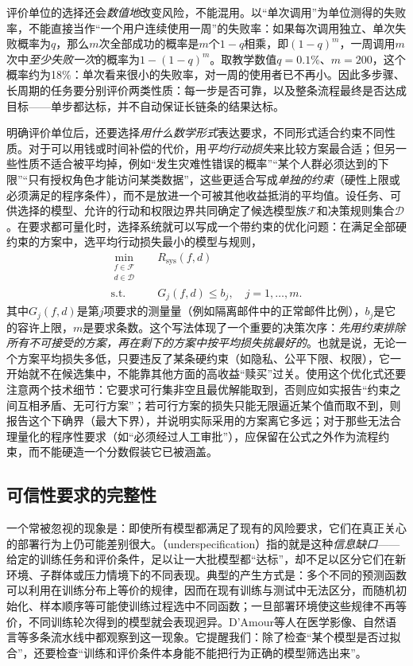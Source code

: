 评价单位的选择还会\emph{数值地}改变风险，不能混用。以“单次调用”为单位测得的失败率，不能直接当作“一个用户连续使用一周”的失败率：如果每次调用独立、单次失败概率为$q$，那么$m$次全部成功的概率是$m$个$1-q$相乘，即$(1-q)^m$，一周调用$m$次中\emph{至少失败一次}的概率为$1-(1-q)^m$。取教学数值$q=0.1\%$、$m=200$，这个概率约为18\%：单次看来很小的失败率，对一周的使用者已不再小。因此多步骤、长周期的任务要分别评价两类性质：每一步是否可靠，以及整条流程最终是否达成目标——单步都达标，并不自动保证长链条的结果达标。

明确评价单位后，还要选择\emph{用什么数学形式}表达要求，不同形式适合约束不同性质。对于可以用钱或时间补偿的代价，用\emph{平均行动损失}来比较方案最合适；但另一些性质不适合被平均掉，例如“发生灾难性错误的概率”“某个人群必须达到的下限”“只有授权角色才能访问某类数据”，这些更适合写成\emph{单独的约束}（硬性上限或必须满足的程序条件），而不是放进一个可被其他收益抵消的平均值。设任务、可供选择的模型、允许的行动和权限边界共同确定了候选模型族$\mathcal F$和决策规则集合$\mathcal D$。在要求都可量化时，选择系统就可以写成一个带约束的优化问题：在满足全部硬约束的方案中，选平均行动损失最小的模型与规则，
\begin{equation}
 \begin{aligned}
  \min_{\substack{f\in\mathcal F\\d\in\mathcal D}}\quad
  &R_{\mathrm{sys}}(f,d)\\
  \text{s.t.}\quad
  &G_j(f,d)\leq b_j,\quad j=1,\ldots,m.
 \end{aligned}
 \label{eq:trust-constrained-objective}
\end{equation}
其中$G_j(f,d)$是第$j$项要求的测量量（例如隔离邮件中的正常邮件比例），$b_j$是它的容许上限，$m$是要求条数。这个写法体现了一个重要的决策次序：\emph{先用约束排除所有不可接受的方案，再在剩下的方案中按平均损失挑最好的}。也就是说，无论一个方案平均损失多低，只要违反了某条硬约束（如隐私、公平下限、权限），它一开始就不在候选集中，不能靠其他方面的高收益“赎买”过关。使用这个优化式还要注意两个技术细节：它要求可行集非空且最优解能取到，否则应如实报告“约束之间互相矛盾、无可行方案”；若可行方案的损失只能无限逼近某个值而取不到，则报告这个下确界（最大下界），并说明实际采用的方案离它多远；对于那些无法合理量化的程序性要求（如“必须经过人工审批”），应保留在公式之外作为流程约束，而不能硬造一个分数假装它已被涵盖。

\subsection{可信性要求的完整性}

一个常被忽视的现象是：即使所有模型都满足了现有的风险要求，它们在真正关心的部署行为上仍可能差别很大。（underspecification）指的就是这种\emph{信息缺口}——给定的训练任务和评价条件，足以让一大批模型都“达标”，却不足以区分它们在新环境、子群体或压力情境下的不同表现。典型的产生方式是：多个不同的预测函数可以利用在训练分布上等价的规律，因而在现有训练与测试中无法区分，而随机初始化、样本顺序等可能使训练过程选中不同函数；一旦部署环境使这些规律不再等价，不同训练轮次得到的模型就会表现迥异。D'Amour等人在医学影像、自然语言等多条流水线中都观察到这一现象。它提醒我们：除了检查“某个模型是否过拟合”，还要检查“训练和评价条件本身能不能把行为正确的模型筛选出来”。

